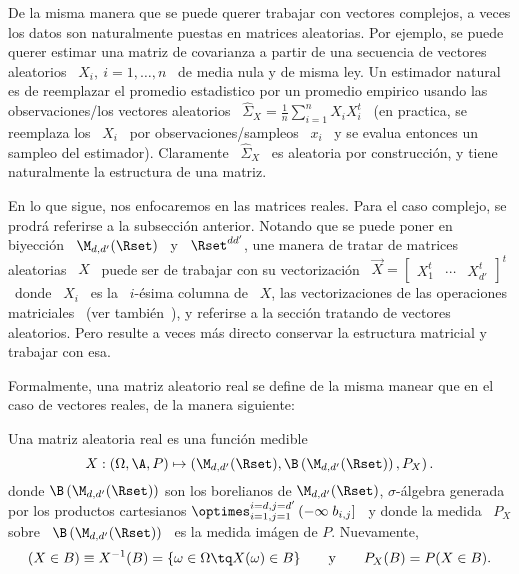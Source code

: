 

\label{Ssec:MP:MA}

De la misma manera que se  puede querer trabajar con vectores complejos, a veces
los datos son naturalmente puestas en matrices aleatorias. Por ejemplo, se puede
querer estimar  una matriz de covarianza  a partir de una  secuencia de vectores
aleatorios \  $X_i, \: i =  1, \ldots ,  n$ \ de media  nula y de misma  ley. Un
estimador  natural es  de reemplazar  el  promedio estadistico  por un  promedio
empirico usando las  observaciones/los vectores aleatorios \ $\widehat{\Sigma}_X
= \frac1n \sum_{i=1}^n X_i X_i^t$ \ (en practica, se reemplaza los \ $X_i$ \ por
observaciones/sampleos  \  $x_i$   \  y  se  evalua  entonces   un  sampleo  del
estimador). Claramente \ $\widehat{\Sigma}_X$ \ es aleatoria por construcci\'on,
y tiene naturalmente la estructura de una matriz.

En lo que sigue, nos enfocaremos  en las matrices reales. Para el caso complejo,
se prodr\'a referirse a la subsecci\'on  anterior. Notando que se puede poner en
biyecci\'on \  $\M_{d,d'}(\Rset)$ \ y \  $\Rset^{d d'}$, une manera  de tratar de
matrices  aleatorias \  $X$ \  puede ser  de trabajar  con su  vectorizaci\'on \
$\vec{X} = \begin{bmatrix} X_1^t &  \cdots & X_{d'}^t \end{bmatrix}^t$ \ donde \
$X_i$  \ es  la  \ $i$-\'esima  columna de  \  $X$, las  vectorizaciones de  las
operaciones   matriciales~\cite[Cap.~2]{MagNeu}  (ver  tambi\'en~\cite{MagNeu79,
  NeuWan83, Har08}), y referirse a la secci\'on tratando de vectores aleatorios.
Pero resulte a veces m\'as  directo conservar la estructura matricial y trabajar
con esa.

Formalmente, una  matriz aleatorio real se define  de la misma manear  que en el
caso de vectores reales, de la manera siguiente:
%
\begin{definicion}
\label{Def:MP:MatrizAleatorioaReal}
%
  Una matriz aleatoria real es una funci\'on medible
  \[
  X:  (\Omega,\A,P) \mapsto  \left( \M_{d,d'}(\Rset)  ,  \B\left( \M_{d,d'}(\Rset)
    \right) , P_X \right).
  \]
  donde   $\B\left(    \M_{d,d'}(\Rset)   \right)$   son    los   borelianos   de
  $\M_{d,d'}(\Rset)$, $\sigma$-\'algebra  generada por los  productos cartesianos
  $\optimes_{i=1,j=1}^{i=d,j=d'}  \left( -\infty \;  b_{i,j} \right]$  \ y
  donde la  medida \ $P_X$  sobre \ $\B\left(  \M_{d,d'}(\Rset) \right)$ \  es la
  medida im\'agen de $P$. Nuevamente,
  \[
  (X \in  B) \equiv  X^{-1}(B) =  \{ \omega \in  \Omega \tq  X(\omega) \in  B \}
  \qquad \mbox{y} \qquad P_X(B) = P(X \in B).
  \]
\end{definicion}

